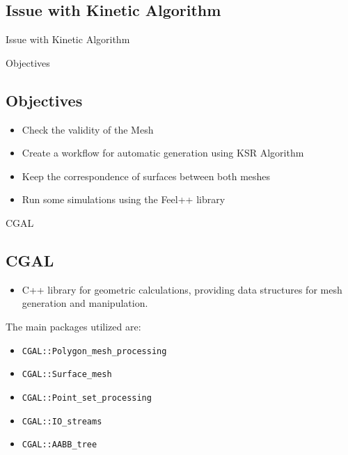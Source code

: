 \documentclass[10pt]{beamer}
\begin{document}
\subsection{Issue with Kinetic Algorithm}
\begin{frame}{Issue with Kinetic Algorithm}
   
\end{frame}


\begin{frame}{Objectives}
    \subsection{Objectives}
    \begin{itemize}
        \item Check the validity of the Mesh
        \item Create a workflow for automatic generation using KSR Algorithm
        \item Keep the correspondence of surfaces between both meshes
        \item Run some simulations using the Feel++ library
    \end{itemize}
\end{frame}


\begin{frame}{CGAL}
    \subsection{CGAL}
    \begin{itemize}
        \item C++ library for geometric calculations, providing data structures for mesh generation and manipulation.
    \end{itemize}
    \vspace{0.5cm}
    The main packages utilized are:
    \begin{itemize}
        \item \texttt{CGAL::Polygon\_mesh\_processing}
        \item \texttt{CGAL::Surface\_mesh}
        \item \texttt{CGAL::Point\_set\_processing}
        \item \texttt{CGAL::IO\_streams}
        \item \texttt{CGAL::AABB\_tree}
    \end{itemize}
    
\end{frame}
\end{document}

